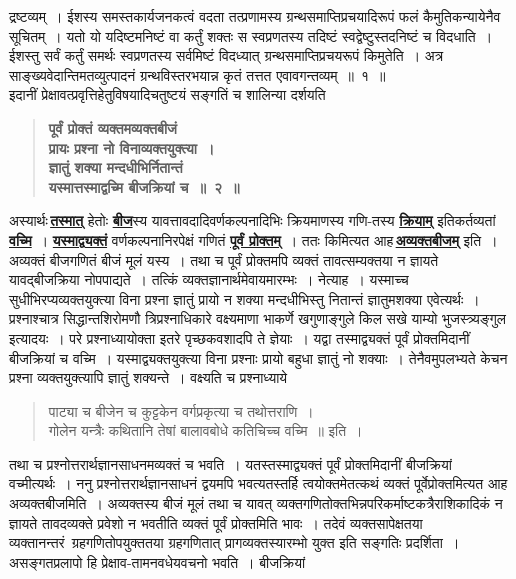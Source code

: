\documentclass[11pt, openany]{book}
\begin{document}
\newpage

\begin{sloppypar}
\noindent द्रष्टव्यम्~। ईशस्य समस्तकार्यजनकत्वं वदता तत्प्रणामस्य ग्रन्थसमाप्तिप्रचयादिरूपं फलं कैमुतिकन्यायेनैव सूचितम्~। यतो यो यदिष्टमनिष्टं वा कर्तुं शक्तः स स्वप्रणतस्य तदिष्टं स्वद्वेष्टुस्तदनिष्टं च विदधाति~। ईशस्तु सर्वं कर्तुं समर्थः स्वप्रणतस्य सर्वमिष्टं विदध्यात् ग्रन्थसमाप्तिप्रचयरूपं किमुतेति~। अत्र साङ्ख्यवेदान्तिमतव्युत्पादनं ग्रन्थविस्तरभयान्न कृतं तत्तत एवावगन्तव्यम्~॥~१~॥\\

{\small इदानीं प्रेक्षावत्प्रवृत्तिहेतुविषयादिचतुष्टयं सङ्गतिं च शालिन्या दर्शयति\textendash }

 \label{1.2}
\begin{quote}
{\large \textbf{{\color{purple}पूर्वं प्रोक्तं व्यक्तमव्यक्तबीजं \\
प्रायः प्रश्ना नो विनाव्यक्तयुक्त्या~।\\
ज्ञातुं शक्या मन्दधीभिर्नितान्तं \\
यस्मात्तस्माद्वच्मि बीजक्रियां च~॥~२~॥}}}
\end{quote}

अस्यार्थः\textendash \,\hyperref[1.2]{\textbf{तस्मात्}} हेतोः \hyperref[1.2]{\textbf{बीज}}स्य यावत्तावदादिवर्णकल्पनादिभिः क्रियमाणस्य गणि-तस्य \hyperref[1.2]{\textbf{क्रियाम्}} इतिकर्तव्यतां \hyperref[1.2]{\textbf{वच्मि}}~। \hyperref[1.2]{\textbf{यस्माद्व्यक्तं}} वर्णकल्पनानिरपेक्षं गणितं \hyperref[1.2]{\textbf{पूर्वं प्रोक्तम्}}~। ततः किमित्यत आह\textendash \,\hyperref[1.2]{\textbf{अव्यक्तबीजम्}} इति~। अव्यक्तं बीजगणितं बीजं मूलं यस्य~। तथा च पूर्वं प्रोक्तमपि व्यक्तं तावत्सम्यक्तया न ज्ञायते यावद्बीजक्रिया नोपपाद्यते~। तत्किं व्यक्तज्ञानार्थमेवायमारम्भः~। नेत्याह~। यस्माच्च सुधीभिरप्यव्यक्तयुक्त्या विना प्रश्ना ज्ञातुं प्रायो न शक्या मन्दधीभिस्तु नितान्तं ज्ञातुमशक्या एवेत्यर्थः~। प्रश्नाश्चात्र सिद्धान्तशिरोमणौ त्रिप्रश्नाधिकारे वक्ष्यमाणा भाकर्णे खगुणाङ्गुले किल सखे याम्यो भुजस्त्र्यङ्गुल इत्यादयः~। परे प्रश्नाध्यायोक्ता इतरे पृच्छकवशादपि ते ज्ञेयाः~। यद्वा तस्माद्व्यक्तं पूर्वं प्रोक्तमिदानीं बीजक्रियां च वच्मि~। यस्माद्व्यक्तयुक्त्या विना प्रश्नाः प्रायो बहुधा ज्ञातुं नो शक्याः~। तेनैवमुपलभ्यते केचन प्रश्ना व्यक्तयुक्त्यापि ज्ञातुं शक्यन्ते~। वक्ष्यति च {\color{violet}प्रश्नाध्याये\textendash }

\begin{quote}
{\color{violet}पाट्या च बीजेन च कुट्टकेन वर्गप्रकृत्या च तथोत्तराणि~।\\
गोलेन यन्त्रैः कथितानि तेषां बालावबोधे कतिचिच्च वच्मि~॥} इति~।
\end{quote}

तथा च प्रश्नोत्तरार्थज्ञानसाधनमव्यक्तं च भवति~। यतस्तस्माद्व्यक्तं पूर्वं प्रोक्तमिदानीं बीजक्रियां वच्मीत्यर्थः~। ननु प्रश्नोत्तरार्थज्ञानसाधनं द्वयमपि भवत्यतस्तर्हि त्वयोक्तमेतत्कथं व्यक्तं पूर्वेप्रोक्तमित्यत आह\textendash \,अव्यक्तबीजमिति~। अव्यक्तस्य बीजं मूलं तथा च यावत् व्यक्तगणितोक्तभिन्नपरिकर्माष्टकत्रैराशिकादिकं न ज्ञायते तावदव्यक्ते प्रवेशो न भवतीति व्यक्तं पूर्वं प्रोक्तमिति भावः~। तदेवं व्यक्तसापेक्षतया व्यक्तानन्तरं~ग्रहगणितोपयुक्ततया ग्रहगणितात् प्रागव्यक्तस्यारम्भो युक्त इति सङ्गतिः प्रदर्शिता~। असङ्गतप्रलापो हि प्रेक्षाव-तामनवधेयवचनो भवति~। बीजक्रियां
\end{sloppypar}
\end{document}
